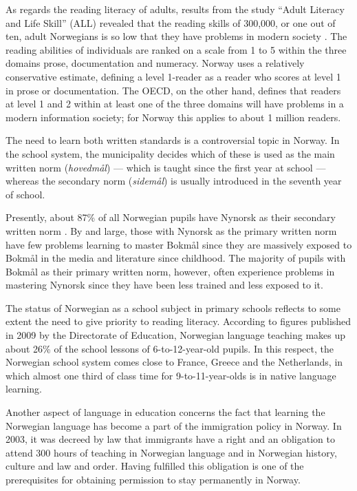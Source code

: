 \begin{multicols}{2}
As regards the reading literacy of adults, results from the study ``Adult Literacy and Life Skill'' (ALL) revealed that the reading skills of 300,000, or one out of ten, adult Norwegians is so low that they have problems in modern society \cite{gab:2005}. 
The reading abilities of individuals are ranked on a scale from 1 to 5 within the three domains prose, documentation and numeracy. 
Norway uses a relatively conservative estimate, defining a level 1-reader as a reader who scores at level 1 in prose or documentation. 
The OECD, on the other hand, defines that readers at level 1 and 2 within at least one of the three domains will have problems in a modern information society; for Norway this applies to about 1 million readers.

The need to learn both written standards is a controversial topic in Norway. 
In the school system, the municipality decides which of these is used as the main written norm (\textit{hovedmål}) — which is taught since the first year at school — whereas the secondary norm (\textit{sidemål}) is usually introduced in the seventh year of school. 

Presently, about 87\% of all Norwegian pupils have Nynorsk as their secondary written norm \cite{SR:2010}.
By and large, those with Nynorsk as the primary written norm have few problems learning to master Bokmål since they are massively exposed to Bokmål in the media and literature since childhood. 
The majority of pupils with Bokmål as their primary written norm, however, often experience problems in mastering Nynorsk since they have been less trained and less exposed to it. 

The status of Norwegian as a school subject in primary schools reflects to some extent the need to give priority to reading literacy. 
According to figures published in 2009 by the Directorate of Education, Norwegian language teaching makes up about 26\% of the school lessons of 6-to-12-year-old pupils. 
In this respect, the Norwegian school system comes close to France, Greece and the Netherlands, in which almost one third of class time for 9-to-11-year-olds is in native language learning.

Another aspect of language in education concerns the fact that learning the Norwegian language has become a part of the immigration policy in Norway. 
In 2003, it was decreed by law that immigrants have a right and an obligation to attend 300 hours of teaching in Norwegian language and in Norwegian history, culture and law and order. 
Having fulfilled this obligation is one of the prerequisites for obtaining permission to stay permanently in Norway.


\end{multicols}
